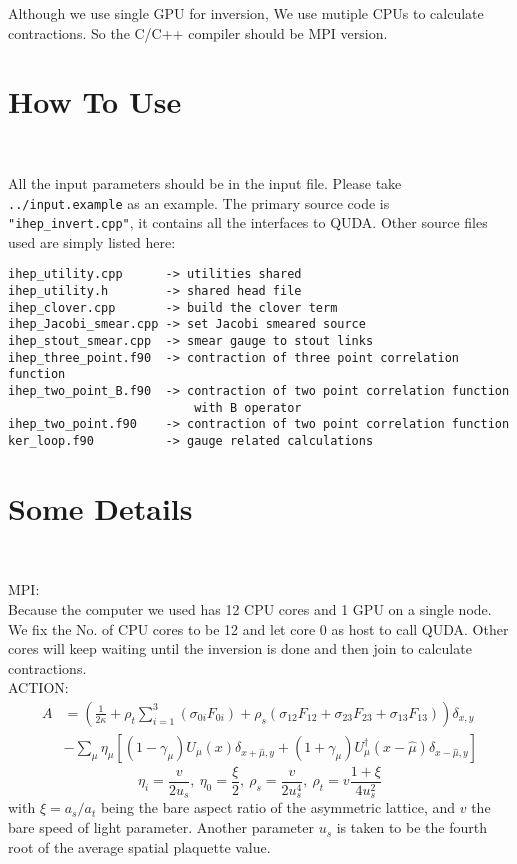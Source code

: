 \documentclass[12pt,fleqn]{article}
\def\be{\begin{equation}}
\def\ee{\end{equation}}
\begin{document}
Although we use single GPU for inversion, We use mutiple CPUs to calculate
contractions. So the C/C++ compiler should be MPI version.

\section{How To Use}
~

All the input parameters should be in the input file. Please take \verb|../input.example|
as an example. The primary source code is \verb|"ihep_invert.cpp"|, it contains all the
interfaces to QUDA. Other source files used are simply listed here:
\begin{verbatim}
ihep_utility.cpp      -> utilities shared
ihep_utility.h        -> shared head file
ihep_clover.cpp       -> build the clover term
ihep_Jacobi_smear.cpp -> set Jacobi smeared source
ihep_stout_smear.cpp  -> smear gauge to stout links
ihep_three_point.f90  -> contraction of three point correlation function
ihep_two_point_B.f90  -> contraction of two point correlation function
                          with B operator
ihep_two_point.f90    -> contraction of two point correlation function
ker_loop.f90          -> gauge related calculations
\end{verbatim}

\section{Some Details}
~

MPI:\\

Because the computer we used has 12 CPU cores and 1 GPU on a single node. We fix
the No. of CPU cores to be 12 and let core 0 as host to call QUDA. Other cores
will keep waiting until the inversion is done and then join to calculate contractions.\\

ACTION:
\be
\begin{split}
A &= \left(\frac{1}{2\kappa}
    + \rho_t\sum_{i=1}^3(\sigma_{0i}F_{0i})
    + \rho_s(\sigma_{12}F_{12}+\sigma_{23}F_{23}+\sigma_{13}F_{13})\right)\delta_{x,y}\\
    &- \sum_\mu \eta_\mu\left[(1-\gamma_\mu)U_\mu(x)\delta_{x+\hat\mu,y}
    + (1+\gamma_\mu)U_\mu^\dagger(x-\hat\mu)\delta_{x-\hat\mu,y}\right]
\end{split}
\ee
\be
\eta_i=\frac{v}{2u_s},~\eta_0=\frac{\xi}{2},~\rho_s=\frac{v}{2u_s^4},~
\rho_t=v\frac{1+\xi}{4u_s^2}
\ee
with $\xi = a_s/a_t$ being the bare aspect ratio of the asymmetric lattice, and $v$ the bare speed of light
parameter. Another parameter $u_s$ is taken to be the fourth root of the average spatial plaquette
value.\\
\end{document}
